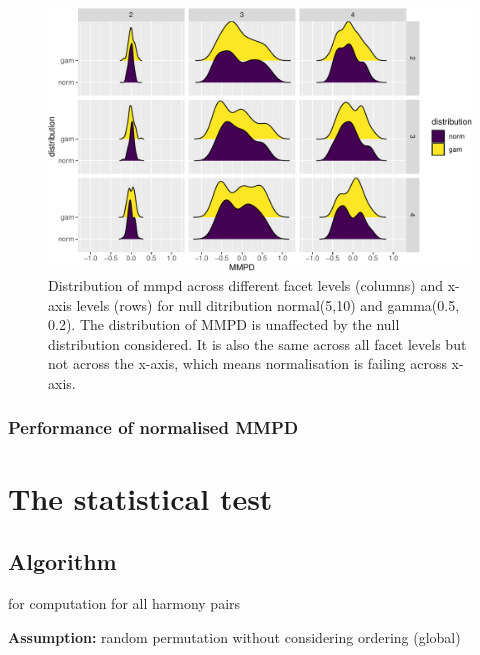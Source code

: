 \documentclass[
]{article}
\begin{document}
\begin{figure}

{\centering \includegraphics[width=\textwidth]{figure/null-dist-1} 

}

\caption{Distribution of mmpd across different facet levels (columns) and x-axis levels (rows) for null ditribution normal(5,10) and gamma(0.5, 0.2). The distribution of MMPD is unaffected by the null distribution considered. It is also the same across all facet levels but not across the x-axis, which means normalisation is failing across x-axis.}\label{fig:null-dist}
\end{figure}

\hypertarget{performance-of-normalised-mmpd}{%
\subsubsection{Performance of normalised MMPD}\label{performance-of-normalised-mmpd}}

\hypertarget{the-statistical-test}{%
\section{The statistical test}\label{the-statistical-test}}

\hypertarget{algorithm-1}{%
\subsection{Algorithm}\label{algorithm-1}}

for computation for all harmony pairs

\textbf{Assumption:} random permutation without considering ordering
(global)
\end{document}
